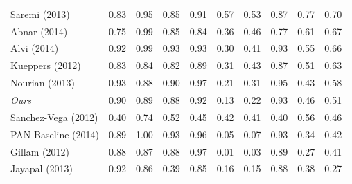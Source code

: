 \begin{table}[th]
\begin{tabularx}{.3\textwidth}{@{}l*{9}{X}}
Saremi (2013)               &         0.83 &   0.95 &    0.85 &       0.91 &   0.57 &    0.53 &      0.87 &   0.77 &    0.70 \\
Abnar (2014)                &         0.75 &   0.99 &    0.85 &       0.84 &   0.36 &    0.46 &      0.77 &   0.61 &    0.67 \\
Alvi (2014)                 &         0.92 &   0.99 &    0.93 &       0.93 &   0.30 &    0.41 &      0.93 &   0.55 &    0.66 \\
Kueppers (2012)             &         0.83 &   0.84 &    0.82 &       0.89 &   0.31 &    0.43 &      0.87 &   0.51 &    0.63 \\
Nourian (2013)              &         0.93 &   0.88 &    0.90 &       0.97 &   0.21 &    0.31 &      0.95 &   0.43 &    0.58 \\
\textit{Ours}               &         0.90 &   0.89 &    0.88 &       0.92 &   0.13 &    0.22 &      0.93 &   0.46 &    0.51 \\
Sanchez-Vega (2012)         &         0.40 &   0.74 &    0.52 &       0.45 &   0.42 &    0.41 &      0.40 &   0.56 &    0.46 \\
PAN Baseline (2014)         &         0.89 &   1.00 &    0.93 &       0.96 &   0.05 &    0.07 &      0.93 &   0.34 &    0.42 \\
Gillam (2012)               &         0.88 &   0.87 &    0.88 &       0.97 &   0.01 &    0.03 &      0.89 &   0.27 &    0.41 \\
Jayapal (2013)              &         0.92 &   0.86 &    0.39 &       0.85 &   0.16 &    0.15 &      0.88 &   0.38 &    0.27 \\

\bottomrule
\end{tabularx}


\end{table}
